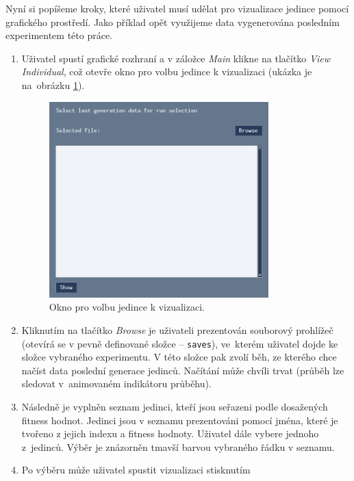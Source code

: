 Nyní si popíšeme kroky, které uživatel musí udělat pro vizualizace jedince
pomocí grafického prostředí. Jako příklad opět využijeme data vygenerována
posledním experimentem této práce.
\begin{enumerate}
    \item Uživatel spustí grafické rozhraní a v záložce \emph{Main} klikne na
        tlačítko \emph{View Individual}, což otevře okno pro volbu jedince k
        vizualizaci (ukázka je na~obrázku
        \ref{doc_23_visualization_indiv_popup}).
    \begin{figure}[!htb]
        \centering
        \includegraphics[width=0.8\textwidth]{../img/indiv_visualization_popup.jpg}
        \caption{Okno pro volbu jedince k vizualizaci.}
        \label{doc_23_visualization_indiv_popup}
    \end{figure}
    \item Kliknutím na tlačítko \emph{Browse} je uživateli prezentován
        souborový prohlížeč (otevírá se v pevně definované složce --
        \texttt{saves}), ve~kterém uživatel dojde ke složce vybraného
        experimentu. V této složce pak zvolí běh, ze kterého chce načíst data
        poslední generace jedinců. Načítání může chvíli trvat (průběh lze
        sledovat v~animovaném indikátoru průběhu).
    \item Následně je vyplněn seznam jedinci, kteří jsou seřazeni podle
        dosažených fitness hodnot. Jedinci jsou v seznamu prezentováni pomocí
        jména, které je tvořeno z jejich indexu a fitness hodnoty. Uživatel
        dále vybere jednoho z~jedinců. Výběr je znázorněn tmavší barvou
        vybraného řádku v seznamu.
    \item Po výběru může uživatel spustit vizualizaci stisknutím

\end{enumerate}
